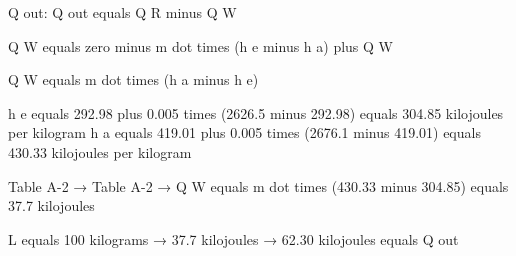 Q out:  
Q out equals Q R minus Q W  

Q W equals zero minus m dot times (h e minus h a) plus Q W  

Q W equals m dot times (h a minus h e)  

h e equals 292.98 plus 0.005 times (2626.5 minus 292.98) equals 304.85 kilojoules per kilogram  
h a equals 419.01 plus 0.005 times (2676.1 minus 419.01) equals 430.33 kilojoules per kilogram  

Table A-2 → Table A-2 → Q W equals m dot times (430.33 minus 304.85) equals 37.7 kilojoules  

L equals 100 kilograms → 37.7 kilojoules → 62.30 kilojoules equals Q out